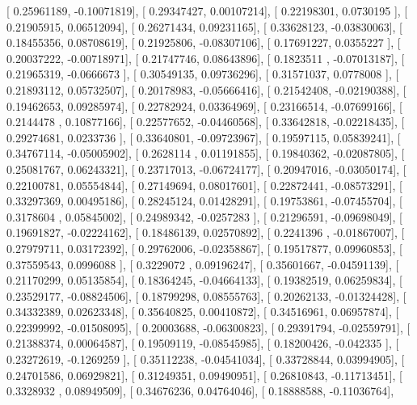 \documentclass{article}
\begin{document}
       [ 0.25961189, -0.10071819],
       [ 0.29347427,  0.00107214],
       [ 0.22198301,  0.0730195 ],
       [ 0.21905915,  0.06512094],
       [ 0.26271434,  0.09231165],
       [ 0.33628123, -0.03830063],
       [ 0.18455356,  0.08708619],
       [ 0.21925806, -0.08307106],
       [ 0.17691227,  0.0355227 ],
       [ 0.20037222, -0.00718971],
       [ 0.21747746,  0.08643896],
       [ 0.1823511 , -0.07013187],
       [ 0.21965319, -0.0666673 ],
       [ 0.30549135,  0.09736296],
       [ 0.31571037,  0.0778008 ],
       [ 0.21893112,  0.05732507],
       [ 0.20178983, -0.05666416],
       [ 0.21542408, -0.02190388],
       [ 0.19462653,  0.09285974],
       [ 0.22782924,  0.03364969],
       [ 0.23166514, -0.07699166],
       [ 0.2144478 ,  0.10877166],
       [ 0.22577652, -0.04460568],
       [ 0.33642818, -0.02218435],
       [ 0.29274681,  0.0233736 ],
       [ 0.33640801, -0.09723967],
       [ 0.19597115,  0.05839241],
       [ 0.34767114, -0.05005902],
       [ 0.2628114 ,  0.01191855],
       [ 0.19840362, -0.02087805],
       [ 0.25081767,  0.06243321],
       [ 0.23717013, -0.06724177],
       [ 0.20947016, -0.03050174],
       [ 0.22100781,  0.05554844],
       [ 0.27149694,  0.08017601],
       [ 0.22872441, -0.08573291],
       [ 0.33297369,  0.00495186],
       [ 0.28245124,  0.01428291],
       [ 0.19753861, -0.07455704],
       [ 0.3178604 ,  0.05845002],
       [ 0.24989342, -0.0257283 ],
       [ 0.21296591, -0.09698049],
       [ 0.19691827, -0.02224162],
       [ 0.18486139,  0.02570892],
       [ 0.2241396 , -0.01867007],
       [ 0.27979711,  0.03172392],
       [ 0.29762006, -0.02358867],
       [ 0.19517877,  0.09960853],
       [ 0.37559543,  0.0996088 ],
       [ 0.3229072 ,  0.09196247],
       [ 0.35601667, -0.04591139],
       [ 0.21170299,  0.05135854],
       [ 0.18364245, -0.04664133],
       [ 0.19382519,  0.06259834],
       [ 0.23529177, -0.08824506],
       [ 0.18799298,  0.08555763],
       [ 0.20262133, -0.01324428],
       [ 0.34332389,  0.02623348],
       [ 0.35640825,  0.00410872],
       [ 0.34516961,  0.06957874],
       [ 0.22399992, -0.01508095],
       [ 0.20003688, -0.06300823],
       [ 0.29391794, -0.02559791],
       [ 0.21388374,  0.00064587],
       [ 0.19509119, -0.08545985],
       [ 0.18200426, -0.042335  ],
       [ 0.23272619, -0.1269259 ],
       [ 0.35112238, -0.04541034],
       [ 0.33728844,  0.03994905],
       [ 0.24701586,  0.06929821],
       [ 0.31249351,  0.09490951],
       [ 0.26810843, -0.11713451],
       [ 0.3328932 ,  0.08949509],
       [ 0.34676236,  0.04764046],
       [ 0.18888588, -0.11036764],
\end{document}

